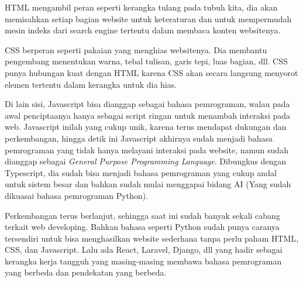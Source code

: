 \documentclass{article}
\begin{document}
HTML mengambil peran seperti kerangka tulang pada tubuh kita, dia akan memisahkan setiap bagian website untuk keteraturan dan untuk mempermudah mesin indeks dari search engine tertentu dalam membaca konten websitenya.

CSS berperan seperti pakaian yang menghias websitenya. Dia membantu pengembang menentukan warna, tebal tulisan, garis tepi, luas bagian, dll. CSS punya hubungan kuat dengan HTML karena CSS akan secara langsung menyorot elemen tertentu dalam kerangka untuk dia hias.

Di lain sisi, Javascript bisa dianggap sebagai bahasa pemrograman, walau pada awal penciptaanya hanya sebagai script ringan untuk menambah interaksi pada web. Javascript inilah yang cukup unik, karena terus mendapat dukungan dan perkembangan, hingga detik ini Javascript akhirnya sudah menjadi bahasa pemrograman yang tidak hanya melayani interaksi pada website, namun sudah dianggap sebagai \textit{General Purpose Programming Language}. Dibungkus dengan Typescript, dia sudah bisa menjadi bahasa pemrograman yang cukup andal untuk sistem besar dan bahkan sudah mulai menggapai bidang AI (Yang sudah dikuasai bahasa pemrograman Python).

Perkembangan terus berlanjut, sehingga saat ini sudah banyak sekali cabang terkait web developing. Bahkan bahasa seperti Python sudah punya caranya tersendiri untuk bisa menghasilkan website sederhana tanpa perlu paham HTML, CSS, dan Javascript. Lalu ada React, Laravel, Django, dll yang hadir sebagai kerangka kerja tangguh yang masing-masing membawa bahasa pemrograman yang berbeda dan pendekatan yang berbeda.


\end{document}
